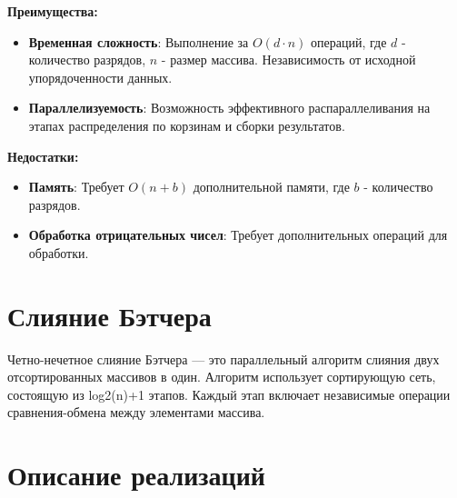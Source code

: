 \documentclass[12pt,a4paper]{extarticle}
\begin{document}
	\textbf{Преимущества:}
	\begin{itemize}
    		\item \textbf{Временная сложность}: Выполнение за $O(d \cdot n)$ операций, где $d$ - количество разрядов, $n$ - размер массива. Независимость от исходной упорядоченности данных.
    
    		\item \textbf{Параллелизуемость}: Возможность эффективного распараллеливания на этапах распределения по корзинам и сборки результатов.
	\end{itemize}

	\textbf{Недостатки:}

	\begin{itemize}
    		\item \textbf{Память}: Требует $O(n + b)$ дополнительной памяти, где $b$ - количество разрядов.
    
    		\item \textbf{Обработка отрицательных чисел}: Требует дополнительных операций для обработки.
    
	\end{itemize}

	\section{Слияние Бэтчера}
	Четно-нечетное слияние Бэтчера — это параллельный алгоритм слияния двух отсортированных массивов в один. Алгоритм использует сортирующую сеть, состоящую из log2(n)+1 этапов. Каждый этап включает независимые операции сравнения-обмена между элементами массива.

	\section{Описание реализаций}
\end{document}
